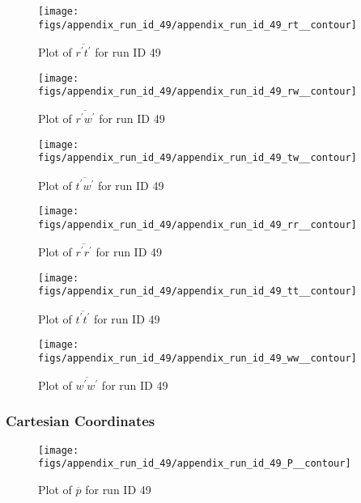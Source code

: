 \begin{figure}[H]
\centering
\texttt{[image: figs/appendix\_run\_id\_49/appendix\_run\_id\_49\_rt\_\_contour]}
\caption{Plot of $\overline{r^\prime t^\prime}$ for run ID 49}
\label{fig:appendix_run_id_49_rt__contour}
\end{figure}


\begin{figure}[H]
\centering
\texttt{[image: figs/appendix\_run\_id\_49/appendix\_run\_id\_49\_rw\_\_contour]}
\caption{Plot of $\overline{r^\prime w^\prime}$ for run ID 49}
\label{fig:appendix_run_id_49_rw__contour}
\end{figure}


\begin{figure}[H]
\centering
\texttt{[image: figs/appendix\_run\_id\_49/appendix\_run\_id\_49\_tw\_\_contour]}
\caption{Plot of $\overline{t^\prime w^\prime}$ for run ID 49}
\label{fig:appendix_run_id_49_tw__contour}
\end{figure}


\begin{figure}[H]
\centering
\texttt{[image: figs/appendix\_run\_id\_49/appendix\_run\_id\_49\_rr\_\_contour]}
\caption{Plot of $\overline{r^\prime r^\prime}$ for run ID 49}
\label{fig:appendix_run_id_49_rr__contour}
\end{figure}


\begin{figure}[H]
\centering
\texttt{[image: figs/appendix\_run\_id\_49/appendix\_run\_id\_49\_tt\_\_contour]}
\caption{Plot of $\overline{t^\prime t^\prime}$ for run ID 49}
\label{fig:appendix_run_id_49_tt__contour}
\end{figure}


\begin{figure}[H]
\centering
\texttt{[image: figs/appendix\_run\_id\_49/appendix\_run\_id\_49\_ww\_\_contour]}
\caption{Plot of $\overline{w^\prime w^\prime}$ for run ID 49}
\label{fig:appendix_run_id_49_ww__contour}
\end{figure}


\subsubsection{Cartesian Coordinates}
\begin{figure}[H]
\centering
\texttt{[image: figs/appendix\_run\_id\_49/appendix\_run\_id\_49\_P\_\_contour]}
\caption{Plot of $\overline{p}$ for run ID 49}
\label{fig:appendix_run_id_49_P__contour}
\end{figure}


